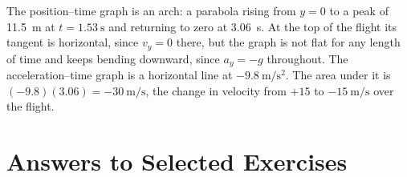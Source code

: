 \documentclass[11pt,twoside,openany]{book}
\begin{document}
\begin{description}[leftmargin=2em,itemsep=2pt]
  \item[2.8] The position--time graph is an arch: a parabola rising from $y = 0$ to a peak of \SI{11.5}{\metre} at $t = \SI{1.53}{\second}$ and returning to zero at \SI{3.06}{\second}. At the top of the flight its tangent is horizontal, since $v_y = 0$ there, but the graph is not flat for any length of time and keeps bending downward, since $a_y = -g$ throughout. The acceleration--time graph is a horizontal line at $\SI{-9.8}{\metre\per\second\squared}$. The area under it is $(-9.8)(3.06) = \SI{-30}{\metre\per\second}$, the change in velocity from $+15$ to $\SI{-15}{\metre\per\second}$ over the flight.
\end{description}

\section*{Answers to Selected Exercises}
\end{document}
